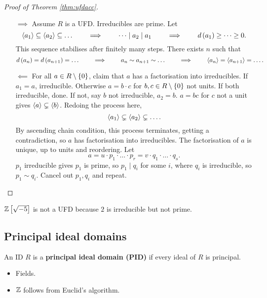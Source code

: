 \begin{proof}[Proof of Theorem \ref{thm:ufdacc}]
\hfill
\begin{itemize}
\item[$ \implies $] Assume $ R $ is a UFD. Irreducibles are prime. Let
$$ \left\langle a_1 \right\rangle \subseteq \left\langle a_2 \right\rangle \subseteq \dots \qquad \implies \qquad \dots \mid a_2 \mid a_1 \qquad \implies \qquad d\left( a_1 \right) \ge \dots \ge 0. $$
This sequence stabilises after finitely many steps. There exists $ n $ such that
$$ d\left( a_n \right) = d\left( a_{n + 1} \right) = \dots \qquad \implies \qquad a_n \sim a_{n + 1} \sim \dots \qquad \implies \qquad \left\langle a_n \right\rangle = \left\langle a_{n + 1} \right\rangle = \dots. $$
\item[$ \impliedby $] For all $ a \in R \setminus \left\{ 0 \right\} $, claim that $ a $ has a factorisation into irreducibles. If $ a_1 = a $, irreducible. Otherwise $ a = b \cdot c $ for $ b, c \in R \setminus \left\{ 0 \right\} $ not units. If both irreducible, done. If not, say $ b $ not irreducible, $ a_2 = b $. $ a = bc $ for $ c $ not a unit gives $ \left\langle a \right\rangle \subsetneq \left\langle b \right\rangle $. Redoing the process here,
$$ \left\langle a_1 \right\rangle \subsetneq \left\langle a_2 \right\rangle \subsetneq \dots. $$
By ascending chain condition, this process terminates, getting a contradiction, so $ a $ has factorisation into irreducibles. The factorisation of $ a $ is unique, up to units and reordering. Let
$$ a = u \cdot p_1 \cdot \dots \cdot p_r = v \cdot q_1 \cdot \dots \cdot q_s. $$
$ p_1 $ irreducible gives $ p_1 $ is prime, so $ p_1 \mid q_i $ for some $ i $, where $ q_i $ is irreducible, so $ p_1 \sim q_i $. Cancel out $ p_1, q_i $ and repeat.
\end{itemize}
\end{proof}

\begin{remark*}
$ \mathbb{Z}\left[ \sqrt{-5} \right] $ is not a UFD because $ 2 $ is irreducible but not prime.
\end{remark*}

\pagebreak

\subsection{Principal ideal domains}

\begin{definition}
An ID $ R $ is a \textbf{principal ideal domain (PID)} if every ideal of $ R $ is principal.
\end{definition}

\begin{example*}
\hfill
\begin{itemize}
\item Fields.
\item $ \mathbb{Z} $ follows from Euclid's algorithm.
\end{itemize}
\end{example*}

